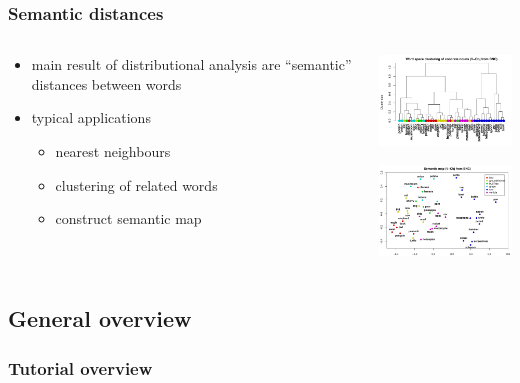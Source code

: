 \begin{frame}
  \frametitle{Semantic distances}

  \begin{columns}[T]
    \begin{column}{55mm}
      \begin{itemize}
      \item main result of distributional analysis are ``semantic'' distances between words
      \item typical applications
        \begin{itemize}
        \item nearest neighbours
        \item clustering of related words
        \item construct semantic map
        \end{itemize}
      \end{itemize}
    \end{column}
    \begin{column}{55mm}
      \ungap[1]
      \includegraphics[width=50mm]{img/hieroglyph_clustering}

      \gap[1]
      \includegraphics[width=50mm]{img/hieroglyph_semantic_map}
    \end{column}
  \end{columns}
\end{frame}

\subsection{General overview}

\begin{frame}
  \frametitle{Tutorial overview}

  \TODO[Overview]
\end{frame}


